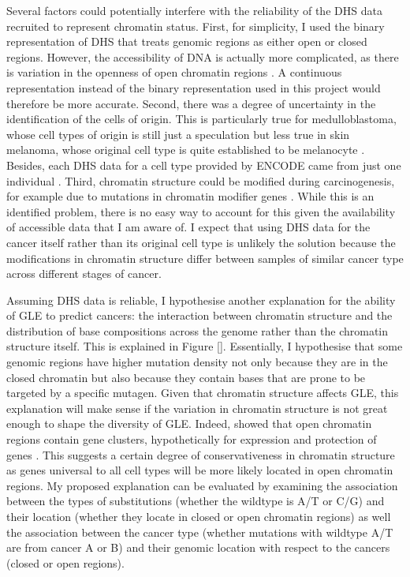 Several factors could potentially interfere with the reliability of the DHS data recruited to represent chromatin status. First, for simplicity, I used the binary representation of DHS that treats genomic regions as either open or closed regions. However, the accessibility of DNA is actually more complicated, as there is variation in the openness of open chromatin regions \citep{Boyle2008High-ResolutionGenome}. A continuous representation instead of the binary representation used in this project would therefore be more accurate. Second, there was a degree of uncertainty in the identification of the cells of origin. This is particularly true for medulloblastoma, whose cell types of origin is still just a speculation \citep{Penas2015TheMedulloblastoma} but less true in skin melanoma, whose original cell type is quite established to be melanocyte \citep{Lin2007MelanocytePigmentation}. Besides, each DHS data for a cell type provided by ENCODE came from just one individual \citep{Thurman2012TheGenome}. Third, chromatin structure could be modified during carcinogenesis, for example due to mutations in chromatin modifier genes \citep{Makova2015TheGenome}. While this is an identified problem, there is no easy way to account for this given the availability of accessible data that I am aware of. I expect that using DHS data for the cancer itself rather than its original cell type is unlikely the solution because the modifications in chromatin structure differ between samples of similar cancer type across different stages of cancer.

Assuming DHS data is reliable, I hypothesise another explanation for the ability of GLE to predict cancers: the interaction between chromatin structure and the distribution of base compositions across the genome rather than the chromatin structure itself. This is explained in Figure \ref{}. Essentially, I hypothesise that some genomic regions have higher mutation density not only because they are in the closed chromatin but also because they contain bases that are prone to be targeted by a specific mutagen. Given that chromatin structure affects GLE, this explanation will make sense if the variation in chromatin structure is not great enough to shape the diversity of GLE. Indeed, \citet{Gilbert2004ChromatinFibers} showed that open chromatin regions contain gene clusters, hypothetically for expression and protection of genes \citep{Gilbert2004ChromatinFibers,Gazave2005DoesDamage}. This suggests a certain degree of conservativeness in chromatin structure as genes universal to all cell types will be more likely located in open chromatin regions. My proposed explanation can be evaluated by examining the association between the types of substitutions (whether the wildtype is A/T or C/G) and their location (whether they locate in closed or open chromatin regions) as well the association between the cancer type (whether mutations with wildtype A/T are from cancer A or B) and their genomic location with respect to the cancers (closed or open regions). 


